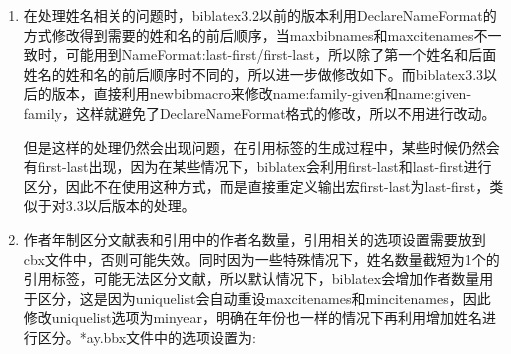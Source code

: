 \begin{enumerate}
\item 在处理姓名相关的问题时，biblatex3.2以前的版本利用DeclareNameFormat的方式修改得到需要的姓和名的前后顺序，当maxbibnames和maxcitenames不一致时，可能用到NameFormat:last-first/first-last，所以除了第一个姓名和后面姓名的姓和名的前后顺序时不同的，所以进一步做修改如下。而biblatex3.3以后的版本，直接利用newbibmacro来修改name:family-given和name:given-family，这样就避免了DeclareNameFormat格式的修改，所以不用进行改动。
\begin{texlist}

\end{texlist}

但是这样的处理仍然会出现问题，在引用标签的生成过程中，某些时候仍然会有first-last出现，因为在某些情况下，biblatex会利用first-last和last-first进行区分，因此不在使用这种方式，而是直接重定义输出宏first-last为last-first，类似于对3.3以后版本的处理。

\item 作者年制区分文献表和引用中的作者名数量，引用相关的选项设置需要放到cbx文件中，否则可能失效。同时因为一些特殊情况下，姓名数量截短为1个的引用标签，可能无法区分文献，所以默认情况下，biblatex会增加作者数量用于区分，这是因为uniquelist会自动重设maxcitenames和mincitenames，因此修改uniquelist选项为minyear，明确在年份也一样的情况下再利用增加姓名进行区分。*ay.bbx文件中的选项设置为:
\begin{texlist}
\end{texlist}


\end{enumerate}
